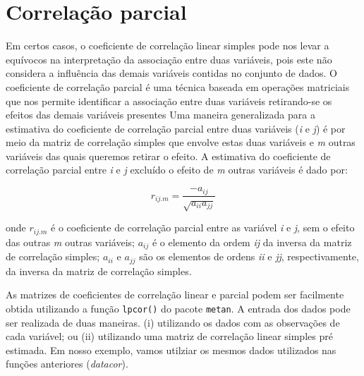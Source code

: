 \documentclass[
]{book}
\begin{document}
\hypertarget{correlauxe7uxe3o-parcial}{%
\section{Correlação parcial}\label{correlauxe7uxe3o-parcial}}

Em certos casos, o coeficiente de correlação linear simples pode nos levar a equívocos na interpretação da associação entre duas variáveis, pois este não considera a influência das demais variáveis contidas no conjunto de dados. O coeficiente de correlação parcial  é uma técnica baseada em operações matriciais que nos permite identificar a associação entre duas variáveis retirando-se os efeitos das demais variáveis presentes \citep{Anderson2003} Uma maneira generalizada para a estimativa do coeficiente de correlação parcial entre duas variáveis (\emph{i} e \emph{j}) é por meio da matriz de correlação simples que envolve estas duas variáveis e \emph{m} outras variáveis das quais queremos retirar o efeito. A estimativa do coeficiente de correlação parcial entre \emph{i} e \emph{j} excluído o efeito de \emph{m} outras variáveis é dado por:

\[
{r_{ij.m} = \frac{{- {a_{ij}}}}{{\sqrt {{a_{ii}}{a_{jj}}}}}}
\]

onde \(r_{ij.m}\) é o coeficiente de correlação parcial  entre as variável \emph{i} e \emph{j}, sem o efeito das outras \emph{m} outras variáveis; \(a_{ij}\) é o elemento da ordem \emph{ij} da inversa da matriz de correlação simples; \(a_{ii}\) e \(a_{jj}\) são os elementos de ordens \emph{ii} e \emph{jj}, respectivamente, da inversa da matriz de correlação simples.

As matrizes de coeficientes de correlação linear e parcial podem ser facilmente obtida utilizando a função \texttt{lpcor()}  do pacote \texttt{metan}. A entrada dos dados pode ser realizada de duas maneiras. (i) utilizando os dados com as observações de cada variável; ou (ii) utilizando uma matriz de correlação linear simples pré estimada. Em nosso exemplo, vamos utilziar os mesmos dados utilizados nas funções anteriores (\emph{datacor}).
\end{document}
